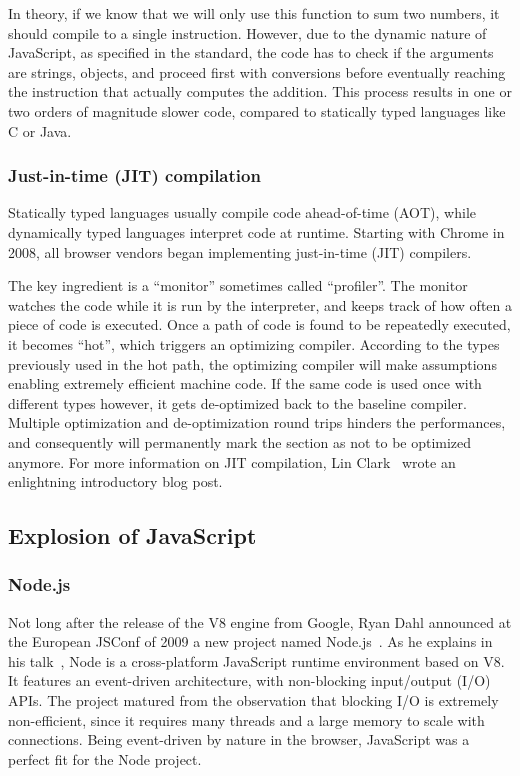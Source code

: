 In theory, if we know that we will only use this function
to sum two numbers, it should compile to a single instruction.
However, due to the dynamic nature of JavaScript,
as specified in the standard, the code has to check if the arguments
are strings, objects, and proceed first with conversions before
eventually reaching the instruction that actually computes the addition.
This process results in one or two orders of magnitude slower code,
compared to statically typed languages like C or Java.

\subsubsection{Just-in-time (JIT) compilation}%
\label{ssub:just_in_time_jit_compilation}

Statically typed languages usually compile code ahead-of-time (AOT),
while dynamically typed languages interpret code at runtime.
Starting with Chrome in 2008, all browser vendors began implementing
just-in-time (JIT) compilers.

The key ingredient is a ``monitor'' sometimes called ``profiler''.
The monitor watches the code while it is run by the interpreter,
and keeps track of how often a piece of code is executed.
Once a path of code is found to be repeatedly executed, it becomes ``hot'',
which triggers an optimizing compiler.
According to the types previously used in the hot path,
the optimizing compiler will make assumptions enabling
extremely efficient machine code.
If the same code is used once with different types however,
it gets de-optimized back to the baseline compiler.
Multiple optimization and de-optimization round trips
hinders the performances, and consequently will permanently mark
the section as not to be optimized anymore.
For more information on JIT compilation, Lin Clark~\cite{clark-jit}
wrote an enlightning introductory blog post.


\subsection{Explosion of JavaScript}%
\label{sub:explosion_of_javascript}


\subsubsection{Node.js}%
\label{ssub:node_js}

Not long after the release of the V8 engine from Google,
Ryan Dahl announced at the European JSConf of 2009
a new project named Node.js~\cite{node-js-speaker}.
As he explains in his talk~\cite{node-js-video},
Node is a cross-platform JavaScript runtime environment based on V8.
It features an event-driven architecture, with non-blocking input/output (I/O) APIs.
The project matured from the observation that blocking I/O is extremely non-efficient,
since it requires many threads and a large memory to scale with connections.
Being event-driven by nature in the browser,
JavaScript was a perfect fit for the Node project.

